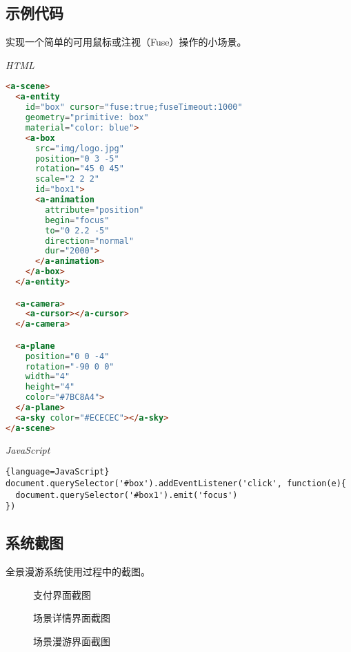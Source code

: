 \subsection{示例代码}
实现一个简单的可用鼠标或注视（Fuse）操作的小场景。

\emph{HTML}
\begin{lstlisting}[language=HTML]
<a-scene>
  <a-entity
    id="box" cursor="fuse:true;fuseTimeout:1000"
    geometry="primitive: box"
    material="color: blue">
    <a-box
      src="img/logo.jpg"
      position="0 3 -5"
      rotation="45 0 45"
      scale="2 2 2"
      id="box1">
      <a-animation
        attribute="position"
        begin="focus"
        to="0 2.2 -5"
        direction="normal"
        dur="2000">
      </a-animation>
    </a-box>
  </a-entity>

  <a-camera>
    <a-cursor></a-cursor>
  </a-camera>

  <a-plane 
    position="0 0 -4" 
    rotation="-90 0 0" 
    width="4" 
    height="4" 
    color="#7BC8A4">
  </a-plane>
  <a-sky color="#ECECEC"></a-sky>
</a-scene>
\end{lstlisting} 

\emph{JavaScript}
\begin{lstlisting}{language=JavaScript}
document.querySelector('#box').addEventListener('click', function(e){
  document.querySelector('#box1').emit('focus')
})
\end{lstlisting}

\subsection{系统截图}
全景漫游系统使用过程中的截图。

\begin{figure}[htp]
\centering
{}
\caption{支付界面截图}
\label{fig:app1}
\end{figure}

\begin{figure}[htp]
\centering
{}
\caption{场景详情界面截图}
\label{fig:app2}
\end{figure}

\begin{figure}[htp]
\centering
{}
\caption{场景漫游界面截图}
\label{fig:app3}
\end{figure}